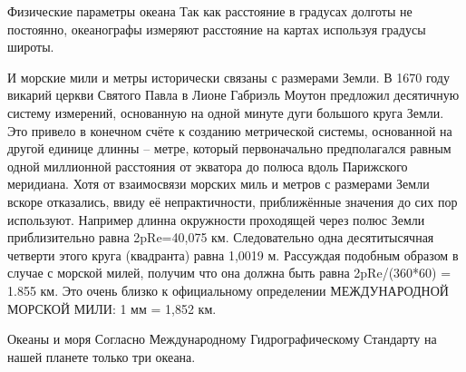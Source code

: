 \begin{chapter}{Физические параметры океана}
Так как расстояние в градусах долготы не постоянно, океанографы
измеряют расстояние на картах используя градусы широты.
%

И морские мили и метры исторически связаны с размерами Земли. В 1670
году викарий церкви Святого Павла в Лионе Габриэль Моутон предложил
десятичную систему измерений, основанную на одной минуте дуги большого
круга Земли. Это привело в конечном счёте к созданию метрической
системы, основанной на другой единице длинны – метре, который
первоначально предполагался равным одной миллионной расстояния от
экватора до полюса вдоль Парижского меридиана. Хотя от взаимосвязи
морских миль и метров с размерами Земли вскоре отказались, ввиду её
непрактичности, приближённые значения до сих пор используют. Например
длинна окружности проходящей через полюс Земли приблизительно равна
2pRe=40,075 км. Следовательно одна десятитысячная четверти этого круга
(квадранта) равна 1,0019 м. Рассуждая подобным образом в случае с
морской милей, получим что она должна быть равна 2pRe/(360*60) = 1.855
км. Это очень близко к официальному определении МЕЖДУНАРОДНОЙ МОРСКОЙ
МИЛИ: 1 мм = 1,852 км.
%


\begin{section}{Океаны и моря}
Согласно Международному Гидрографическому Стандарту на нашей планете
только три океана.
%



\end{section}
\end{chapter}
